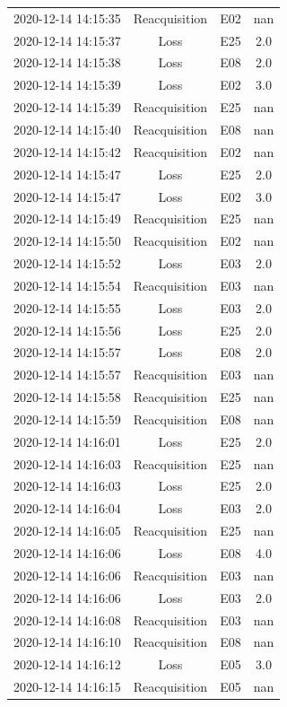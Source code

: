\begin{enumerate}
\begin{longtabu}{cccc}
2020{-}12{-}14 14:15:35&Reacquisition&E02&nan\\%
2020{-}12{-}14 14:15:37&Loss&E25&2.0\\%
2020{-}12{-}14 14:15:38&Loss&E08&2.0\\%
2020{-}12{-}14 14:15:39&Loss&E02&3.0\\%
2020{-}12{-}14 14:15:39&Reacquisition&E25&nan\\%
2020{-}12{-}14 14:15:40&Reacquisition&E08&nan\\%
2020{-}12{-}14 14:15:42&Reacquisition&E02&nan\\%
2020{-}12{-}14 14:15:47&Loss&E25&2.0\\%
2020{-}12{-}14 14:15:47&Loss&E02&3.0\\%
2020{-}12{-}14 14:15:49&Reacquisition&E25&nan\\%
2020{-}12{-}14 14:15:50&Reacquisition&E02&nan\\%
2020{-}12{-}14 14:15:52&Loss&E03&2.0\\%
2020{-}12{-}14 14:15:54&Reacquisition&E03&nan\\%
2020{-}12{-}14 14:15:55&Loss&E03&2.0\\%
2020{-}12{-}14 14:15:56&Loss&E25&2.0\\%
2020{-}12{-}14 14:15:57&Loss&E08&2.0\\%
2020{-}12{-}14 14:15:57&Reacquisition&E03&nan\\%
2020{-}12{-}14 14:15:58&Reacquisition&E25&nan\\%
2020{-}12{-}14 14:15:59&Reacquisition&E08&nan\\%
2020{-}12{-}14 14:16:01&Loss&E25&2.0\\%
2020{-}12{-}14 14:16:03&Reacquisition&E25&nan\\%
2020{-}12{-}14 14:16:03&Loss&E25&2.0\\%
2020{-}12{-}14 14:16:04&Loss&E03&2.0\\%
2020{-}12{-}14 14:16:05&Reacquisition&E25&nan\\%
2020{-}12{-}14 14:16:06&Loss&E08&4.0\\%
2020{-}12{-}14 14:16:06&Reacquisition&E03&nan\\%
2020{-}12{-}14 14:16:06&Loss&E03&2.0\\%
2020{-}12{-}14 14:16:08&Reacquisition&E03&nan\\%
2020{-}12{-}14 14:16:10&Reacquisition&E08&nan\\%
2020{-}12{-}14 14:16:12&Loss&E05&3.0\\%
2020{-}12{-}14 14:16:15&Reacquisition&E05&nan\\%

\end{longtabu}
\end{enumerate}
